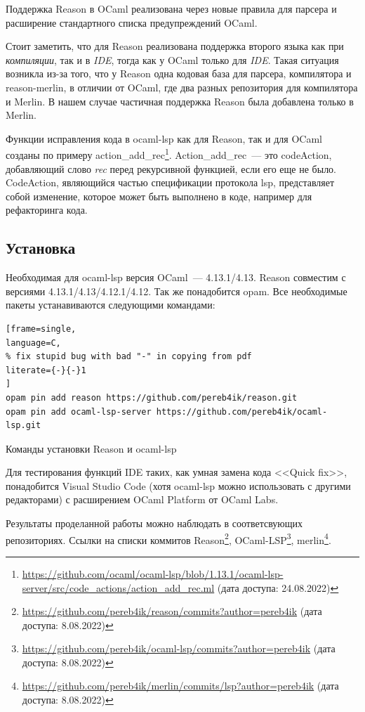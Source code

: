 Поддержка Reason в OCaml реализована через новые правила для парсера и расширение стандартного списка предупреждений OCaml.

Стоит заметить, что для Reason реализована поддержка второго языка как при {\it компиляции}, так и в {\it IDE}, тогда как у OCaml только для {\it IDE}. Такая ситуация возникла из-за того, что у Reason одна кодовая база для парсера, компилятора и reason-merlin, в отличии от OCaml, где два разных репозитория для компилятора и Merlin. В нашем случае частичная поддержка Reason была добавлена только в Merlin.

Функции исправления кода в ocaml-lsp как для Reason, так и для OCaml созданы по примеру action\_add\_rec\footnote{ \url{https://github.com/ocaml/ocaml-lsp/blob/1.13.1/ocaml-lsp-server/src/code_actions/action_add_rec.ml} (дата доступа: 24.08.2022) }. Action\_add\_rec~--- это code\-Action, добавляющий слово {\it rec} перед рекурсивной функцией, если его еще не было. CodeAction, являющийся частью спецификации протокола lsp, представляет собой изменение, которое может быть выполнено в коде, например для рефакторинга кода.

\subsection{Установка}
Необходимая для ocaml-lsp версия OCaml~--- 4.13.1/4.13. Reason совместим с версиями 4.13.1/4.13/4.12.1/4.12. Так же понадобится opam. Все необходимые пакеты устанавиваются следующими командами:

\lstset{basicstyle=\ttfamily}
\begin{example}
\begin{lstlisting}[frame=single,
language=C,
% fix stupid bug with bad "-" in copying from pdf
literate={-}{-}1
]
opam pin add reason https://github.com/pereb4ik/reason.git
opam pin add ocaml-lsp-server https://github.com/pereb4ik/ocaml-lsp.git
\end{lstlisting}
\caption{Команды установки Reason и ocaml-lsp}
\end{example}
Для тестирования функций IDE таких, как умная замена кода <<Quick fix>>, понадобится Visual Studio Code (хотя ocaml-lsp можно использовать с другими редакторами) с расширением OCaml Platform от OCaml Labs.

Результаты проделанной работы можно наблюдать в соответсвующих репозиториях. Ссылки на списки коммитов Reason\footnote{ \url{https://github.com/pereb4ik/reason/commits?author=pereb4ik} (дата доступа: 8.08.2022) },
OCaml-LSP\footnote{ \url{https://github.com/pereb4ik/ocaml-lsp/commits?author=pereb4ik} (дата доступа: 8.08.2022) },
merlin\footnote{ \url{https://github.com/pereb4ik/merlin/commits/lsp?author=pereb4ik} (дата доступа: 8.08.2022) }.